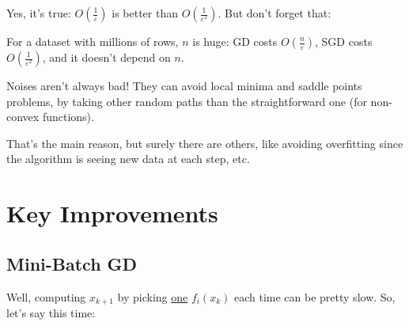 Yes, it's true: $O\!\left(\frac{1}{\varepsilon}\right)$ is better than $O\!\left(\frac{1}{\varepsilon^2}\right)$. But don't forget that:
\begin{center}
\end{center}
For a dataset with millions of rows, $n$ is huge: GD costs $O\!\left(\frac{n}{\varepsilon}\right)$, SGD costs $O\!\left(\frac{1}{\varepsilon^2}\right)$, and it doesn't depend on $n$.


Noises aren't always bad! They can avoid local minima and saddle points problems, by taking other random paths than the straightforward one (for non-convex functions).

That's the main reason, but surely there are others, like avoiding overfitting since the algorithm is seeing new data at each step, etc.

\section{Key Improvements}

\subsection*{\color{inkred}Mini-Batch GD}

Well, computing $x_{k+1}$ by picking \underline{one} $f_i(x_k)$ each time can be pretty slow. So, let's say this time:

